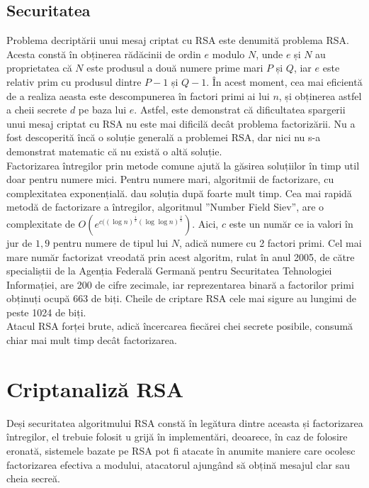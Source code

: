 \documentclass[12]{article}
\begin{document}
\subsection{Securitatea}
Problema decriptării unui mesaj criptat cu RSA este denumită problema RSA. Acesta constă în obținerea rădăcinii de ordin $e$ modulo $N$, unde $e$ și $N$ au proprietatea că $N$ este produsul a două numere prime mari $P$ și $Q$, iar $e$ este relativ prim cu produsul dintre $P-1$ și $Q-1$. În acest moment, cea mai eficientă de a realiza aeasta este descompunerea în factori primi ai lui $n$, și obținerea astfel a cheii secrete $d$ pe baza lui $e$. Astfel, este demonstrat că dificultatea spargerii unui mesaj criptat cu RSA nu este mai dificilă decât problema factorizării. Nu a fost descoperită încă o soluție generală a problemei RSA, dar nici nu s-a demonstrat matematic că nu există o altă soluție. \\
Factorizarea întregilor prin metode comune ajută la găsirea soluțiilor în timp util doar pentru numere mici. Pentru numere mari, algoritmii de factorizare, cu complexitatea exponențială. dau soluția după foarte mult timp. Cea mai rapidă metodă de factorizare a întregilor, algoritmul ”Number Field Siev”, are o complexitate de $O(e^{c((\log n)^{\frac{1}{3}} (\log \log n)^{\frac{2}{3}}       })$. Aici, $c$ este un număr ce ia valori în jur de $1,9$ pentru numere de tipul lui $N$, adică numere cu 2 factori primi. Cel mai mare număr factorizat vreodată prin acest algoritm, rulat în anul 2005, de către specialiștii de la Agenția Federală Germană pentru Securitatea Tehnologiei Informației, are 200 de cifre zecimale, iar reprezentarea binară a factorilor primi obținuți ocupă 663 de biți. Cheile de criptare RSA cele mai sigure au lungimi de peste 1024 de biți.\\
Atacul RSA forței brute, adică încercarea fiecărei chei secrete posibile, consumă chiar mai mult timp decât factorizarea.

\section{Criptanaliză RSA}
Deși securitatea algoritmului RSA constă în legătura dintre aceasta și factorizarea întregilor, el trebuie folosit u grijă în implementări, deoarece, în caz de folosire eronată, sistemele bazate pe RSA pot fi atacate în anumite maniere care ocolesc factorizarea efectiva a modului, atacatorul ajungând să obțină mesajul clar sau cheia secreă.
\end{document}
